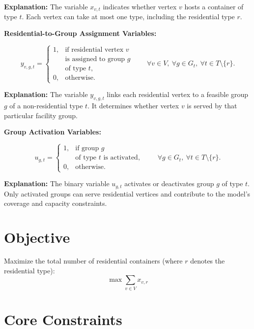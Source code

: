 \documentclass[12pt,a4paper]{article}
\begin{document}
\textbf{Explanation:}  
The variable $x_{v,t}$ indicates whether vertex $v$ hosts a container of type $t$.  
Each vertex can take at most one type, including the residential type $r$.

\vspace{1.5em}

\textbf{Residential-to-Group Assignment Variables:}

\[
y_{v,g,t} =
\begin{cases}
1, & 
\text{if residential vertex } v \\ 
  & \text{is assigned to group } g \\ 
  & \text{of type } t, \\[4pt]
0, & \text{otherwise.}
\end{cases}
\qquad 
\forall v \in V,\ 
\forall g \in G_t,\ 
\forall t \in T \setminus \{r\}.
\]

\textbf{Explanation:}  
The variable $y_{v,g,t}$ links each residential vertex to a feasible group $g$ of a non-residential type $t$.  
It determines whether vertex $v$ is served by that particular facility group.

\vspace{1.5em}

\textbf{Group Activation Variables:}

\[
u_{g,t} =
\begin{cases}
1, & 
\text{if group } g \\ 
  & \text{of type } t \text{ is activated}, \\[4pt]
0, & \text{otherwise.}
\end{cases}
\qquad 
\forall g \in G_t,\ 
\forall t \in T \setminus \{r\}.
\]

\textbf{Explanation:}  
The binary variable $u_{g,t}$ activates or deactivates group $g$ of type $t$.  
Only activated groups can serve residential vertices and contribute to the model’s coverage and capacity constraints.

\newpage

\section{Objective}

Maximize the total number of residential containers (where $r$ denotes the residential type):
\[
\max \sum_{v \in V} x_{v,r}
\]

\section{Core Constraints}
\end{document}
